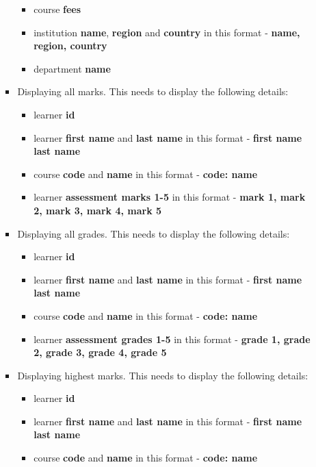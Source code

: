 \documentclass{article}
\begin{document}
\begin{itemize}
\begin{itemize}
\begin{itemize}
\begin{itemize}
                \item course \textbf{fees}
                \item institution \textbf{name}, \textbf{region} and \textbf{country} in this format - \textbf{name, region, country}
                \item department \textbf{name}
            \end{itemize}
            \item Displaying all marks. This needs to display the following details:
            \begin{itemize}
                \item learner \textbf{id}
                \item learner \textbf{first name} and \textbf{last name} in this format - \textbf{first name last name}
                \item course \textbf{code} and \textbf{name} in this format - \textbf{code: name}
                \item learner \textbf{assessment marks 1-5} in this format - \textbf{mark 1, mark 2, mark 3, mark 4, mark 5}
            \end{itemize}
            \item Displaying all grades. This needs to display the following details:
            \begin{itemize}
                \item learner \textbf{id}
                \item learner \textbf{first name} and \textbf{last name} in this format - \textbf{first name last name}
                \item course \textbf{code} and \textbf{name} in this format - \textbf{code: name}
                \item learner  \textbf{assessment grades 1-5} in this format - \textbf{grade 1, grade 2, grade 3, grade 4, grade 5}
            \end{itemize}
            \item Displaying highest marks. This needs to display the following details:
            \begin{itemize}
                \item learner \textbf{id}
                \item learner \textbf{first name} and \textbf{last name} in this format - \textbf{first name last name}
                \item course \textbf{code} and \textbf{name} in this format - \textbf{code: name}

\end{itemize}
\end{itemize}
\end{itemize}
\end{itemize}
\end{document}
